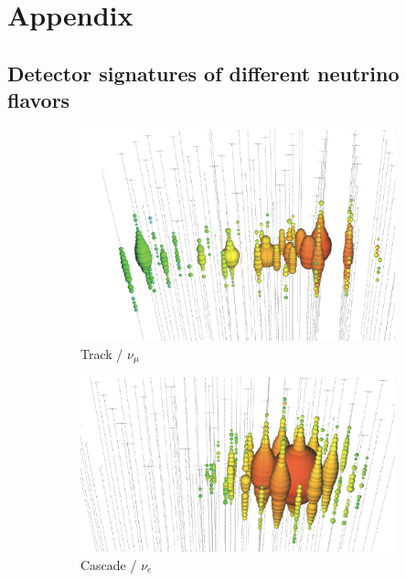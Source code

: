 \chapter{Appendix}

\section{Detector signatures of different neutrino flavors}
\begin{figure}
  \centering
  \begin{subfigure}{0.3\textwidth}
    \centering
    \includegraphics[width=\textwidth]{content/img/signatures/track.png}
    \caption{
        Track / $\nu_\mu$
    }
  \end{subfigure}
  \begin{subfigure}{0.3\textwidth}
    \centering
    \includegraphics[width=\textwidth]{content/img/signatures/cascade.png}
    \caption{
        Cascade / $\nu_e$
    }
  \end{subfigure}
  \begin{subfigure}{0.3\textwidth}

\end{subfigure}
\end{figure}
